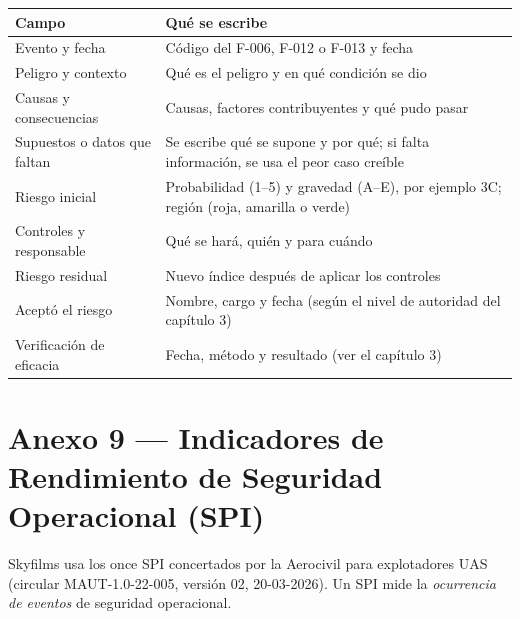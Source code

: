 \begin{tabularx}{\textwidth}{|l|X|}
\hline
\rowcolor[gray]{0.9}\textbf{Campo} & \textbf{Qué se escribe} \\ \hline
Evento y fecha & Código del F-006, F-012 o F-013 y fecha \\ \hline
Peligro y contexto & Qué es el peligro y en qué condición se dio \\ \hline
Causas y consecuencias & Causas, factores contribuyentes y qué pudo pasar \\ \hline
Supuestos o datos que faltan & Se escribe qué se supone y por qué; si falta información, se usa el peor caso creíble \\ \hline
Riesgo inicial & Probabilidad (1--5) y gravedad (A--E), por ejemplo 3C; región (roja, amarilla o verde) \\ \hline
Controles y responsable & Qué se hará, quién y para cuándo \\ \hline
Riesgo residual & Nuevo índice después de aplicar los controles \\ \hline
Aceptó el riesgo & Nombre, cargo y fecha (según el nivel de autoridad del capítulo 3) \\ \hline
Verificación de eficacia & Fecha, método y resultado (ver el capítulo 3) \\ \hline
\end{tabularx}

\clearpage
\section*{Anexo 9 --- Indicadores de Rendimiento de Seguridad Operacional (SPI)}
Skyfilms usa los once SPI concertados por la Aerocivil para explotadores UAS (circular MAUT-1.0-22-005, versión 02, 20-03-2026). Un SPI mide la \textit{ocurrencia de eventos} de seguridad operacional.

